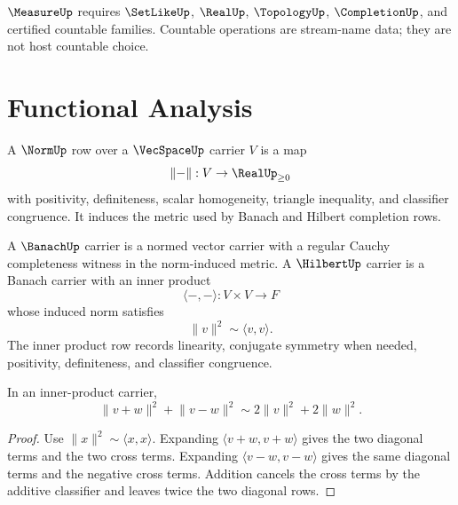 \begin{principle}
\label{prin:analysis-spine-measure-boundary}
$\MeasureUp$ requires $\SetLikeUp$, $\RealUp$, $\TopologyUp$,
$\CompletionUp$, and certified countable families.  Countable operations are
stream-name data; they are not host countable choice.
\end{principle}

\section{Functional Analysis}
\label{sec:analysis-spine-functional-analysis}

\begin{definition}
\label{def:analysis-spine-normed-vector-carrier}
A $\NormUp$ row over a $\VecSpaceUp$ carrier $V$ is a map
$$
\lVert-\rVert:V\to\RealUp_{\ge0}
$$
with positivity, definiteness, scalar homogeneity, triangle inequality, and
classifier congruence.  It induces the metric used by Banach and Hilbert
completion rows.
\end{definition}

\begin{definition}
\label{def:analysis-spine-banach-hilbert-carriers}
A $\BanachUp$ carrier is a normed vector carrier with a regular Cauchy
completeness witness in the norm-induced metric.  A $\HilbertUp$ carrier is
a Banach carrier with an inner product
$$
\langle-,-\rangle:V\times V\to F
$$
whose induced norm satisfies
$$
\lVert v\rVert^2\sim \langle v,v\rangle .
$$
The inner product row records linearity, conjugate symmetry when needed,
positivity, definiteness, and classifier congruence.
\end{definition}

\begin{theorem}
\label{thm:analysis-spine-parallelogram}
In an inner-product carrier,
$$
\lVert v+w\rVert^2+\lVert v-w\rVert^2
\sim
2\lVert v\rVert^2+2\lVert w\rVert^2.
$$
\end{theorem}

\begin{proof}
Use $\lVert x\rVert^2\sim\langle x,x\rangle$.  Expanding
$\langle v+w,v+w\rangle$ gives the two diagonal terms and the two cross
terms.  Expanding $\langle v-w,v-w\rangle$ gives the same diagonal terms and
the negative cross terms.  Addition cancels the cross terms by the additive
classifier and leaves twice the two diagonal rows.
\end{proof}

